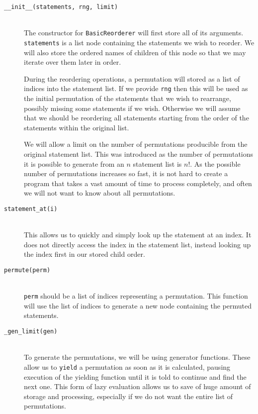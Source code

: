 \documentclass[twoside,a4paper]{report}
\begin{document}
\begin{description}
\item[\texttt{\_\_init\_\_(statements, rng, limit)}] \hfill \\
The constructor for \texttt{BasicReorderer} will first store all of its arguments. \texttt{statements} is a list node containing the statements we wish to
reorder. We will also store the ordered names of children of this node so that we may iterate over them later in order.

During the reordering operations, a permutation will stored as a list of indices into the statement list. If we provide \texttt{rng} then this will be
used as the initial permutation of the statements that we wish to rearrange, possibly missing some statements if we wish. Otherwise we will assume
that we should be reordering all statements starting from the order of the statements within the original list.

We will allow a limit on the number of permutations producible from the original statement list. This was introduced as the number of permutations it
is possible to generate from an $n$ statement list is $n!$. As the possible number of permutations increases so fast, it is not hard to create a program
that takes a vast amount of time to process completely, and often we will not want to know about all permutations.

\item[\texttt{statement\_at(i)}] \hfill \\
This allows us to quickly and simply look up the statement at an index. It does not directly access the index in the statement list, instead looking up
the index first in our stored child order.

\item[\texttt{permute(perm)}] \hfill \\
\texttt{perm} should be a list of indices representing a permutation. This function will use the list of indices to generate a new node containing the
permuted statements.

\item[\texttt{\_gen\_limit(gen)}] \hfill \\
To generate the permutations, we will be using generator functions. These allow us to \texttt{yield} a permutation as soon as it is calculated, pausing
execution of the yielding function until it is told to continue and find the next one. This form of lazy evaluation allows us to save of huge amount
of storage and processing, especially if we do not want the entire list of permutations.


\end{description}
\end{document}
